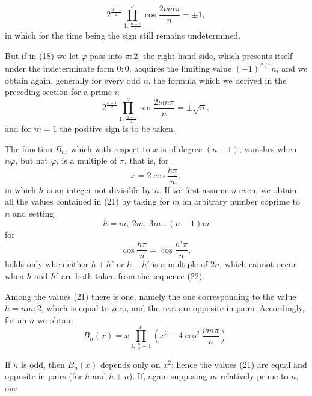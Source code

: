 \[
2^{\frac{n-1}{2}} \prod\limits_{1,\,\frac{n-1}{2}}^{\nu} \cos\frac{2\nu m\pi}{n} = \pm 1, \tag{19}
\]
in which for the time being the sign still remains undetermined.

But if in (18) we let $\varphi$ pass into $\pi:2$, the right-hand side, which presents itself under the indeterminate form $0:0$, acquires the limiting value $(-1)^{\frac{n-1}{2}} n$, and we obtain again, generally for every odd $n$, the formula which we derived in the preceding section for a prime $n$
\[
2^{\frac{n-1}{2}} \prod\limits_{1,\,\frac{n-1}{2}}^{\nu} \sin\frac{2\nu m\pi}{n} = \pm \sqrt{n}, \tag{20}
\]
and for $m=1$ the positive sign is to be taken.

The function $B_n$, which with respect to $x$ is of degree $(n-1)$, vanishes when $n\varphi$, but not $\varphi$, is a multiple of $\pi$, that is, for
\[
x = 2\cos\frac{h\pi}{n}, \tag{21}
\]
in which $h$ is an integer not divisible by $n$. If we first assume $n$ even, we obtain all the  values contained in (21) by taking for $m$ an arbitrary number coprime to $n$ and setting
\[
h = m,\ 2m,\ 3m \ldots (n-1)m \tag{22}
\]
for
\[
\cos\frac{h\pi}{n} = \cos\frac{h'\pi}{n},
\]
holds only when either $h+h'$ or $h-h'$ is a multiple of $2n$, which cannot occur when $h$ and $h'$ are both taken from the sequence (22).

Among the values (21) there is one, namely the one corresponding to the value $h = nm:2$, which is equal to zero, and the rest are opposite in pairs. Accordingly, for an  $n$ we obtain
\[
B_n(x) = x \prod\limits_{1,\,\frac{n}{2}-1}^{\nu} \left(x^2 - 4\cos^2\frac{\nu m\pi}{n}\right). \tag{23}
\]

If $n$ is odd, then $B_n(x)$ depends only on $x^2$; hence the values (21) are equal and opposite in pairs (for $h$ and $h+n$). If, again supposing $m$ relatively prime to $n$, one
